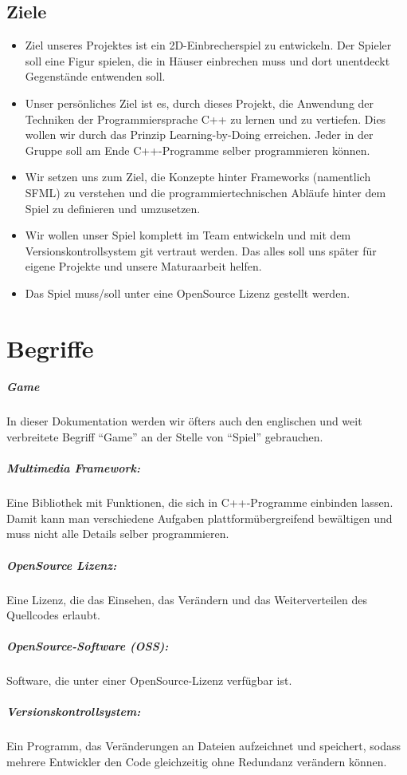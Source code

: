 \documentclass[12pt,a4paper]{scrartcl}
\newcommand{\q}[1]{``#1''}
\begin{document}
\subsection{Ziele}
\begin{itemize}
\item 
Ziel unseres Projektes ist ein 2D-Einbrecherspiel zu entwickeln. Der Spieler soll eine Figur spielen, die in Häuser einbrechen muss und dort unentdeckt Gegenstände entwenden soll.
\item
Unser persönliches Ziel ist es, durch dieses Projekt, die Anwendung der Techniken der
Programmiersprache C++ zu lernen und zu vertiefen. Dies wollen wir durch
das Prinzip Learning-by-Doing erreichen. Jeder in der Gruppe soll am Ende
C++-Programme selber programmieren können.
\item
Wir setzen uns zum Ziel,
die Konzepte hinter Frameworks (namentlich SFML) zu verstehen und die
programmiertechnischen Abläufe hinter dem Spiel zu definieren und
umzusetzen.
\item
Wir wollen unser Spiel komplett im Team entwickeln und
mit dem Versionskontrollsystem git vertraut werden. Das alles soll uns später
für eigene Projekte und unsere Maturaarbeit helfen.
\item
Das Spiel muss/soll unter eine OpenSource Lizenz gestellt werden.
\end{itemize}


\newpage
\section{Begriffe}
\subparagraph{Game}
In dieser Dokumentation werden wir öfters auch den englischen und weit verbreitete Begriff \q{Game} an der Stelle von \q{Spiel} gebrauchen.

\subparagraph{Multimedia Framework:}
Eine Bibliothek mit Funktionen, die sich in C++-Programme einbinden lassen. Damit kann man verschiedene Aufgaben plattformübergreifend bewältigen und muss nicht alle Details selber programmieren.

\subparagraph{OpenSource Lizenz:}

Eine Lizenz, die das Einsehen, das Verändern und das Weiterverteilen des Quellcodes erlaubt.

\subparagraph{OpenSource-Software (OSS):}
Software, die unter einer OpenSource-Lizenz verfügbar ist.

\subparagraph{Versionskontrollsystem:}
Ein Programm, das Veränderungen an Dateien aufzeichnet und speichert, sodass mehrere Entwickler den Code gleichzeitig ohne Redundanz verändern können.
\end{document}
